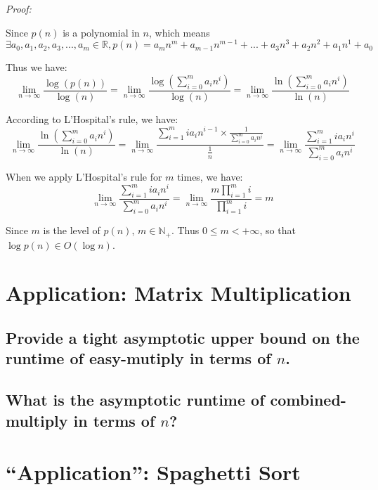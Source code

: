 \documentclass[11pt]{article}
\begin{document}
	\emph{Proof:}

	Since $p(n)$ is a polynomial in $n$, which means 
	\begin{equation*}
		\exists a_0,a_1,a_2,a_3,...,a_m \in \mathbb{R}, p(n) = a_mn^m + a_{m-1}n^{m-1}+...+a_3n^3+a_2n^2+a_1n^1+a_0
	\end{equation*}

	Thus we have:
	\begin{equation*}
		\lim_{n\to\infty} \frac{\log(p(n))}{\log(n)}=\lim_{n\to\infty}\frac{\log (\sum_{i=0}^{m}a_in^i)}{\log (n)}=\lim_{n\to\infty}\frac{\ln (\sum_{i=0}^{m}a_in^i)}{\ln (n)}
	\end{equation*}
	
	According to L'Hospital's rule, we have:
	\begin{equation*}
		\lim_{n\to\infty}\frac{\ln (\sum_{i=0}^{m}a_in^i)}{\ln (n)}= \lim_{n\to\infty}\frac{\sum_{i=1}^{m}ia_in^{i-1}\times\frac{1}{\sum_{i=0}^{m}a_in^i}}{\frac{1}{n}}=\lim_{n\to\infty}\frac{\sum_{i=1}^{m}ia_in^{i}}{\sum_{i=0}^{m}a_in^i}
	\end{equation*}
	
	When we apply L'Hospital's rule for $m$ times, we have:
	\begin{equation*}
		\lim_{n\to\infty}\frac{\sum_{i=1}^{m}ia_in^{i}}{\sum_{i=0}^{m}a_in^i}=\lim_{n\to\infty}\frac{m\prod_{i=1}^{m}i}{\prod_{i=1}^{m}i}=m
	\end{equation*}
	
	Since $m$ is the level of $p(n)$, $m\in \mathbb{N_+}$. Thus $0\leq m<+\infty$, so that $\log p(n) \in O(\log n)$.
\section{Application: Matrix Multiplication}
\subsection{Provide a tight asymptotic upper bound on the runtime of easy-mutiply in terms of $n$.}
	
\subsection{What is the asymptotic runtime of combined-multiply in terms of $n$?}
	
\section{``Application'': Spaghetti Sort}
\end{document}
